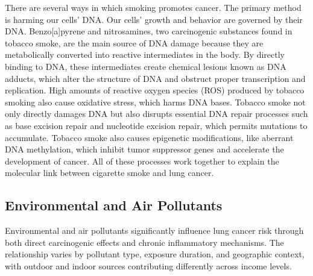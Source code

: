 There are several ways in which smoking promotes cancer. The primary method is harming our cells' 
DNA. Our cells' growth and behavior are governed by their DNA. Benzo[a]pyrene and nitrosamines, two 
carcinogenic substances found in tobacco smoke, are the main source of DNA damage because they are 
metabolically converted into reactive intermediates in the body. By directly binding to DNA, these 
intermediates create chemical lesions known as DNA adducts, which alter the structure of DNA and 
obstruct proper transcription and replication. High amounts of reactive oxygen species (ROS) 
produced by tobacco smoking also cause oxidative stress, which harms DNA bases. Tobacco smoke not 
only directly damages DNA but also disrupts essential DNA repair processes such as base excision 
repair and nucleotide excision repair, which permits mutations to accumulate. Tobacco smoke also 
causes epigenetic modifications, like aberrant DNA methylation, which inhibit tumor suppressor 
genes and accelerate the development of cancer. All of these processes work together to explain the 
molecular link between cigarette smoke and lung cancer.


\subsection{Environmental and Air Pollutants}

Environmental and air pollutants significantly influence lung cancer risk through both direct 
carcinogenic effects and chronic inflammatory mechanisms. The relationship varies by pollutant 
type, exposure duration, and geographic context, with outdoor and indoor sources contributing 
differently across income levels.

